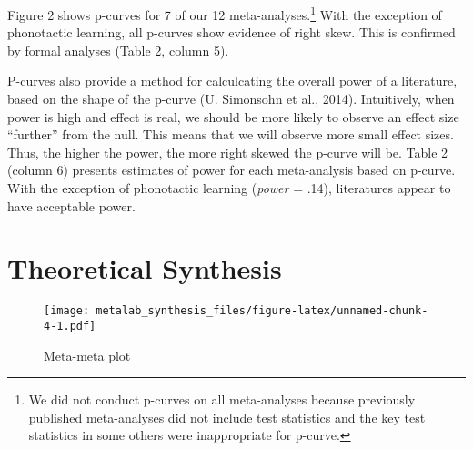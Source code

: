 \documentclass[english,floatsintext,man]{apa6}
\begin{document}
Figure 2 shows p-curves for 7 of our 12
meta-analyses.\footnote{We did not conduct p-curves on all meta-analyses because previously published meta-analyses did not include test statistics and the key test statistics in some others were inappropriate for p-curve. }
With the exception of phonotactic learning, all p-curves show evidence
of right skew. This is confirmed by formal analyses (Table 2, column 5).

P-curves also provide a method for calculcating the overall power of a
literature, based on the shape of the p-curve (U. Simonsohn et al.,
2014). Intuitively, when power is high and effect is real, we should be
more likely to observe an effect size \enquote{further} from the null.
This means that we will observe more small effect sizes. Thus, the
higher the power, the more right skewed the p-curve will be. Table 2
(column 6) presents estimates of power for each meta-analysis based on
p-curve. With the exception of phonotactic learning (\emph{power} =
.14), literatures appear to have acceptable power.

\section{Theoretical Synthesis}\label{theoretical-synthesis}

\begin{figure}[htbp]
\centering
\texttt{[image: metalab\_synthesis\_files/figure-latex/unnamed-chunk-4-1.pdf]}
\caption{Meta-meta plot}
\end{figure}

\singlespacing
\end{document}

